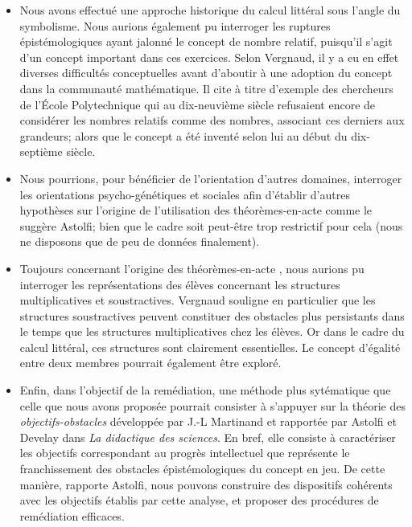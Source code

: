 \documentclass{report}
\theoremstyle{definition}
\newcommand{\tas}{théorèmes-en-acte }
\begin{document}
\begin{itemize}
\item Nous avons effectué une approche historique du calcul littéral sous l'angle du symbolisme. Nous aurions également pu interroger les ruptures épistémologiques ayant jalonné le concept de nombre relatif, puisqu'il s'agit d'un concept important dans ces exercices. Selon Vergnaud, il y a eu en effet diverses difficultés conceptuelles avant d'aboutir à une adoption du concept dans la communauté mathématique. Il cite à titre d'exemple des chercheurs de l'École Polytechnique qui au dix-neuvième siècle refusaient encore de considérer les nombres relatifs comme des nombres, associant ces derniers aux grandeurs; alors que le concept a été inventé selon lui au début du dix-septième siècle.

\item Nous pourrions, pour bénéficier de l'orientation d'autres domaines, interroger les orientations psycho-génétiques et sociales afin d'établir d'autres hypothèses sur l'origine de l'utilisation des théorèmes-en-acte comme le suggère Astolfi; bien que le cadre soit peut-être trop restrictif pour cela (nous ne disposons que de peu de données finalement).

\item Toujours concernant l'origine des \tas, nous aurions pu interroger les représentations des élèves concernant les structures multiplicatives et soustractives. Vergnaud souligne en particulier que les structures soustractives peuvent constituer des obstacles plus persistants dans le temps que les structures multiplicatives chez les élèves. Or dans le cadre du calcul littéral, ces structures sont clairement essentielles. Le concept d'égalité entre deux membres pourrait également être exploré.

\item Enfin, dans l'objectif de la remédiation, une méthode plus sytématique que celle que nous avons proposée pourrait consister à s'appuyer sur la théorie des \textit{objectifs-obstacles} développée par J.-L Martinand et rapportée par Astolfi et Develay dans \textit{La didactique des sciences}. En bref, elle consiste à caractériser les objectifs correspondant au progrès intellectuel que représente le franchissement des obstacles épistémologiques du concept en jeu. De cette manière, rapporte Astolfi, nous pouvons construire des dispositifs cohérents avec les objectifs établis par cette analyse, et proposer des procédures de remédiation efficaces.
\end{itemize}
\end{document}
